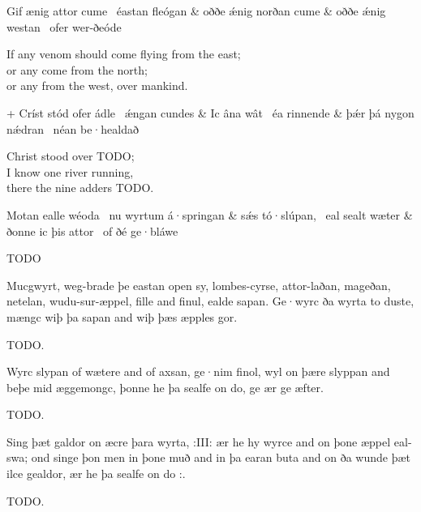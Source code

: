 \bvg{}
\bva[]Gif ænig attor cume \hld\ éastan fleógan &
oððe ǽnig norðan cume &
oððe ǽnig westan \hld\ ofer wer-ðeóde\eva

\bvb If any venom should come flying from the east; \\
or any come from the north; \\
or any from the west, over mankind.\evb\evg


\bvg{}
\bva[]+ Críst stód ofer ádle \hld\ ǽngan cundes &
Ic âna wât \hld\ éa rinnende &
þǽr þá nygon nǽdran \hld\ néan be·healdað\eva

\bvb Christ stood over TODO; \\
I know one river running, \\
there the nine adders TODO.\evb\evg


\bvg{}
\bva[]Motan ealle wéoda \hld\ nu wyrtum á·springan &
sǽs tó·slúpan, \hld\ eal sealt wæter &
ðonne ic þis attor \hld\ of ðé ge·bláwe\eva

\bvb TODO\evb\evg


\bpg\bpa Mucgwyrt, weg-brade þe eastan open sy, lombes-cyrse, attor-laðan, mageðan, netelan, wudu-sur-æppel, fille and finul, ealde sapan. Ge·wyrc ða wyrta to duste, mængc wiþ þa sapan and wiþ þæs æpples gor.\epa

\bpb TODO.\epb\epg


\bpg\bpa Wyrc slypan of wætere and of axsan, ge·nim finol, wyl on þære slyppan and beþe mid æggemongc, þonne he þa sealfe on do, ge ær ge æfter.\epa

\bpb TODO.\epb\epg


\bpg\bpa Sing þæt galdor on æcre þara wyrta, :III: ær he hy wyrce and on þone æppel eal-swa; ond singe þon men in þone muð and in þa earan buta and on ða wunde þæt ilce gealdor, ær he þa sealfe on do :.\epa

\bpb TODO.\epb\epg

\sectionline
